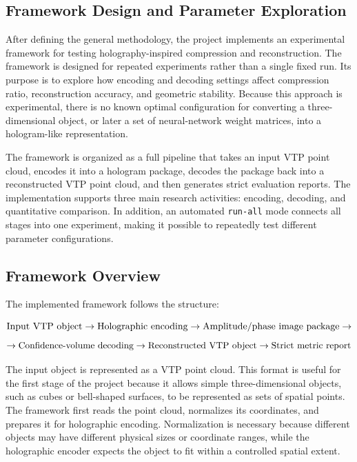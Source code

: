 \documentclass{article}
\begin{document}
\begin{normalsize}
\section{Framework Design and Parameter Exploration}

After defining the general methodology, the project implements an experimental framework for testing holography-inspired compression and reconstruction. The framework is designed for repeated experiments rather than a single fixed run. Its purpose is to explore how encoding and decoding settings affect compression ratio, reconstruction accuracy, and geometric stability. Because this approach is experimental, there is no known optimal configuration for converting a three-dimensional object, or later a set of neural-network weight matrices, into a hologram-like representation.

The framework is organized as a full pipeline that takes an input VTP point cloud, encodes it into a hologram package, decodes the package back into a reconstructed VTP point cloud, and then generates strict evaluation reports. The implementation supports three main research activities: encoding, decoding, and quantitative comparison. In addition, an automated \texttt{run-all} mode connects all stages into one experiment, making it possible to repeatedly test different parameter configurations.

\subsection{Framework Overview}

The implemented framework follows the structure:

\[
\textnormal{Input VTP object}
\rightarrow
\textnormal{Holographic encoding}
\rightarrow
\textnormal{Amplitude/phase image package}
\rightarrow
\]
\[
\rightarrow
\textnormal{Confidence-volume decoding}
\rightarrow
\textnormal{Reconstructed VTP object}
\rightarrow
\textnormal{Strict metric report}
\]

The input object is represented as a VTP point cloud. This format is useful for the first stage of the project because it allows simple three-dimensional objects, such as cubes or bell-shaped surfaces, to be represented as sets of spatial points. The framework first reads the point cloud, normalizes its coordinates, and prepares it for holographic encoding. Normalization is necessary because different objects may have different physical sizes or coordinate ranges, while the holographic encoder expects the object to fit within a controlled spatial extent.


\end{normalsize}
\end{document}
